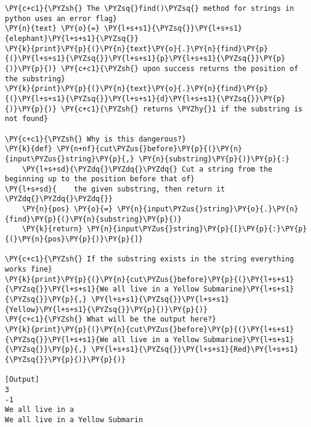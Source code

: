 \begin{Verbatim}[label=\makebox{\url{https://github.com/lucabaldini/cmepda/tree/master/slides/latex/snippets/error\_flags.py}},commandchars=\\\{\}]
\PY{c+c1}{\PYZsh{} The \PYZsq{}find()\PYZsq{} method for strings in python uses an error flag}
\PY{n}{text} \PY{o}{=} \PY{l+s+s1}{\PYZsq{}}\PY{l+s+s1}{elephant}\PY{l+s+s1}{\PYZsq{}}
\PY{k}{print}\PY{p}{(}\PY{n}{text}\PY{o}{.}\PY{n}{find}\PY{p}{(}\PY{l+s+s1}{\PYZsq{}}\PY{l+s+s1}{p}\PY{l+s+s1}{\PYZsq{}}\PY{p}{)}\PY{p}{)} \PY{c+c1}{\PYZsh{} upon success returns the position of the substring}
\PY{k}{print}\PY{p}{(}\PY{n}{text}\PY{o}{.}\PY{n}{find}\PY{p}{(}\PY{l+s+s1}{\PYZsq{}}\PY{l+s+s1}{d}\PY{l+s+s1}{\PYZsq{}}\PY{p}{)}\PY{p}{)} \PY{c+c1}{\PYZsh{} returns \PYZhy{}1 if the substring is not found}

\PY{c+c1}{\PYZsh{} Why is this dangerous?}
\PY{k}{def} \PY{n+nf}{cut\PYZus{}before}\PY{p}{(}\PY{n}{input\PYZus{}string}\PY{p}{,} \PY{n}{substring}\PY{p}{)}\PY{p}{:}
    \PY{l+s+sd}{\PYZdq{}\PYZdq{}\PYZdq{} Cut a string from the beginning up to the position before that of}
\PY{l+s+sd}{    the given substring, then return it \PYZdq{}\PYZdq{}\PYZdq{}}
    \PY{n}{pos} \PY{o}{=} \PY{n}{input\PYZus{}string}\PY{o}{.}\PY{n}{find}\PY{p}{(}\PY{n}{substring}\PY{p}{)}
    \PY{k}{return} \PY{n}{input\PYZus{}string}\PY{p}{[}\PY{p}{:}\PY{p}{(}\PY{n}{pos}\PY{p}{)}\PY{p}{]}

\PY{c+c1}{\PYZsh{} If the substring exists in the string everything works fine}
\PY{k}{print}\PY{p}{(}\PY{n}{cut\PYZus{}before}\PY{p}{(}\PY{l+s+s1}{\PYZsq{}}\PY{l+s+s1}{We all live in a Yellow Submarine}\PY{l+s+s1}{\PYZsq{}}\PY{p}{,} \PY{l+s+s1}{\PYZsq{}}\PY{l+s+s1}{Yellow}\PY{l+s+s1}{\PYZsq{}}\PY{p}{)}\PY{p}{)}
\PY{c+c1}{\PYZsh{} What will be the output here?}
\PY{k}{print}\PY{p}{(}\PY{n}{cut\PYZus{}before}\PY{p}{(}\PY{l+s+s1}{\PYZsq{}}\PY{l+s+s1}{We all live in a Yellow Submarine}\PY{l+s+s1}{\PYZsq{}}\PY{p}{,} \PY{l+s+s1}{\PYZsq{}}\PY{l+s+s1}{Red}\PY{l+s+s1}{\PYZsq{}}\PY{p}{)}\PY{p}{)}

[Output]
3
-1
We all live in a 
We all live in a Yellow Submarin
\end{Verbatim}